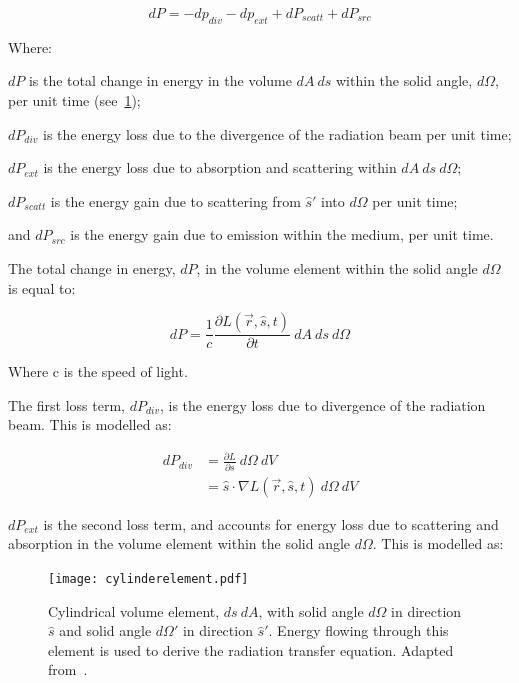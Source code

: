 \begin{equation}
	dP = -dp_{div} - dp_{ext} + dP_{scatt} + dP_{src}
	\label{eqn:enegyconvo}
\end{equation}

\noindent Where:

\indent $dP$ is the total change in energy in the volume $dA\ ds$ within the solid angle, $d\Omega$, per unit time (see~\cref{fig:energydiag2});

\indent $dP_{div}$ is the energy loss due to the divergence of the radiation beam per unit time;

\indent $dP_{ext}$ is the energy loss due to absorption and scattering within $dA\ ds\ d\Omega$;

\indent $dP_{scatt}$ is the energy gain due to scattering from $\hat{s}'$ into $d\Omega$ per unit time;

\indent and $dP_{src}$ is the energy gain due to emission within the medium, per unit time.

\medskip

The total change in energy, $dP$, in the volume element within the solid angle $d\Omega$ is equal to:

\begin{equation}
	dP=\frac{1}{c}\frac{\partial L(\vec{r},\hat{s},t)}{\partial t}\ dA\ ds\ d\Omega
	\label{eqn:p}
\end{equation}

\noindent Where c is the speed of light.

\medskip

The first loss term, $dP_{div}$, is the energy loss due to divergence of the radiation beam. This is modelled as:

\begin{align}
	dP_{div}&=\frac{\partial L}{\partial s}\ d\Omega\ dV \\
		    &=\hat{s} \cdot \nabla L(\vec{r},\hat{s},t)\ d\Omega\ dV
    \label{eqn:pdiv}
\end{align}

$dP_{ext}$ is the second loss term, and accounts for energy loss due to scattering and absorption in the volume element within the solid angle $d\Omega$. This is modelled as:

\begin{figure}[!htb]
	\centering
	\texttt{[image: cylinderelement.pdf]}
	\caption{Cylindrical volume element, $ds\ dA$, with solid angle $d\Omega$ in direction $\hat{s}$ and solid angle $d\Omega'$ in direction $\hat{s}'$. Energy flowing through this element is used to derive the radiation transfer equation. Adapted from~\cite{wang2012biomedical,chandrasekhar2013radiative}.}
	\label{fig:energydiag2}
\end{figure}

